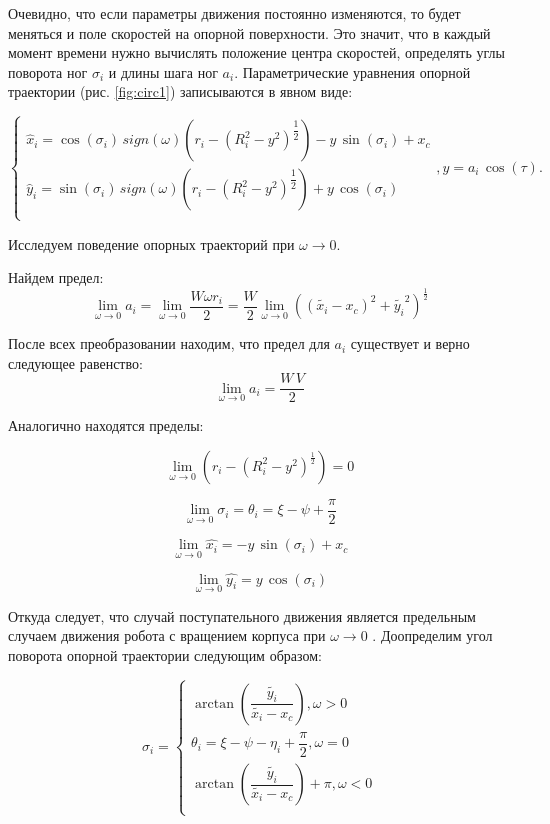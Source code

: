 Очевидно, что если параметры движения постоянно изменяются, то будет меняться и поле скоростей на опорной поверхности. Это значит, что в каждый момент времени нужно вычислять положение центра скоростей, определять углы поворота ног $\sigma_i$ и длины шага ног $a_i$.
Параметрические уравнения опорной траектории (рис. \ref{fig:circ1}) записываются в явном виде:

\begin{equation}
\left\{
\begin{array}{lcr}
\hat{x}_i = \cos(\sigma_i)\,sign(\omega)\left(r_i-(R_i^2-y^2)^{\dfrac{1}{2}}\right)-y\,\sin(\sigma_i)+x_c\\
\hat{y}_i = \sin(\sigma_i)\,sign(\omega)\left(r_i-(R_i^2-y^2)^{\dfrac{1}{2}}\right)+y\,\cos(\sigma_i)\\
\end{array}
\right., y = a_i\,\cos(\tau).
\end{equation} 
 
Исследуем поведение опорных траекторий при  $\omega \to 0$.

Найдем предел: 
$$
\lim_{\omega \to 0}a_i = \lim_{\omega\to0}\dfrac{W\omega r_i}{2} = \dfrac{W}{2}\lim_{\omega\to0}\left((\tilde{x_i}-x_c)^2+\tilde{y_i}^2\right)^{\frac{1}{2}}
$$ 


После всех преобразовании находим, что предел для $a_i$ существует и верно следующее равенство:
$$
\lim_{\omega\to0}a_i = \dfrac{W\,V}{2}
$$

Аналогично находятся пределы:

 $$
 \lim_{\omega\to0}(r_i-\left(R_i^2-y^2\right)^{\frac{1}{2}}) = 0
 $$
 
 $$
 \lim_{\omega\to0}\sigma_i = \theta_i = \xi-\psi+\dfrac{\pi}{2}
 $$
 
 $$
 \lim_{\omega\to0}\hat{x_i} = -y\,\sin(\sigma_i)+x_c
 $$
 
 $$
 \lim_{\omega\to0}\hat{y_i} = y\,\cos(\sigma_i)
 $$
 

 
Откуда следует, что случай поступательного движения является предельным случаем движения робота с вращением корпуса при $\omega\to 0$ .
Доопределим угол поворота опорной траектории следующим образом:

\begin{equation}
\sigma_i = \left\{
\begin{array}{lcr}
\arctan(\dfrac{\tilde{y_i}}{\tilde{x_i}-x_c}),\omega > 0\\
\theta_i = \xi-\psi-\eta_i+\dfrac{\pi}{2},\omega=0\\
\arctan(\dfrac{\tilde{y_i}}{\tilde{x_i}-x_c})+\pi,\omega<0\\
\end{array}
\right.
\end{equation}
 
